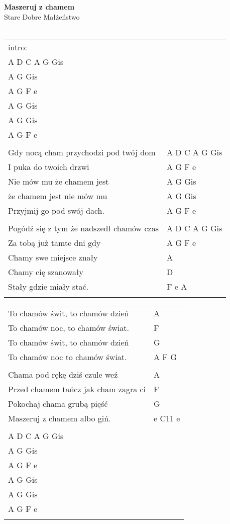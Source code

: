 \documentclass[a5paper]{article}
\begin{document}


\noindent
\fontsize{12pt}{15pt}\selectfont
\textbf{Maszeruj z chamem} \\
\fontsize{8pt}{10pt}\selectfont
Stare Dobre Małżeństwo \\ \\
\fontsize{10pt}{12pt}\selectfont
{}
\begin{tabular}{@{}p{8.00cm}p{3cm}@{}}
\noindent
intro: \\
A D C A G Gis \\
A G Gis \\
A G F e \\
A G Gis \\
A G Gis \\
A G F e \\ \\

Gdy nocą cham przychodzi pod twój dom & A D C A G Gis \\
I puka do twoich drzwi & A G F e \\
Nie mów mu że chamem jest & A G Gis \\
że chamem jest nie mów mu & A G Gis \\
Przyjmij go pod swój dach. & A G F e \\ \\

Pogódź się z tym że nadszedł chamów czas & A D C A G Gis \\
Za tobą już tamte dni gdy & A G F e \\
Chamy swe miejsce znały & A \\
Chamy cię szanowały & D \\
Stały gdzie miały stać. & F e A \\ \\
\end{tabular}

\noindent
\begin{tabular}{@{}p{7.00cm}p{3cm}@{}}
	To chamów świt, to chamów dzień & A \\
	To chamów noc, to chamów świat. & F \\
	To chamów świt, to chamów dzień & G \\
	To chamów noc to chamów świat. & A F G \\ \\

	Chama pod rękę dziś czule weź & A \\
	Przed chamem tańcz jak cham zagra ci & F \\
	Pokochaj chama grubą pięść & G \\
	Maszeruj z chamem albo giń. & e C11 e \\ \\

	A D C A G Gis \\
	A G Gis \\
	A G F e \\
	A G Gis \\
	A G Gis \\
	A G F e \\ \\
\end{tabular}
\end{document}

